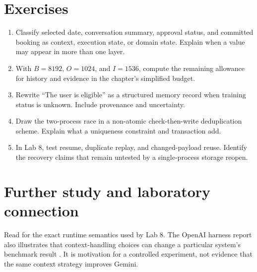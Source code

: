\section{Exercises}
\begin{enumerate}
\item Classify selected date, conversation summary, approval status, and committed booking as context, execution state, or domain state. Explain when a value may appear in more than one layer.
\item With \(B=8192\), \(O=1024\), and \(I=1536\), compute the remaining allowance for history and evidence in the chapter's simplified budget.
\item Rewrite “The user is eligible” as a structured memory record when training status is unknown. Include provenance and uncertainty.
\item Draw the two-process race in a non-atomic check-then-write deduplication scheme. Explain what a uniqueness constraint and transaction add.
\item In Lab 8, test resume, duplicate replay, and changed-payload reuse. Identify the recovery claims that remain untested by a single-process storage reopen.
\end{enumerate}

\section{Further study and laboratory connection}
Read \cite{langgraph-interrupts,langgraph-persistence} for the exact runtime semantics used by Lab 8. The OpenAI harness report also illustrates that context-handling choices can change a particular system's benchmark result \cite{harness-report}. It is motivation for a controlled experiment, not evidence that the same context strategy improves Gemini.

